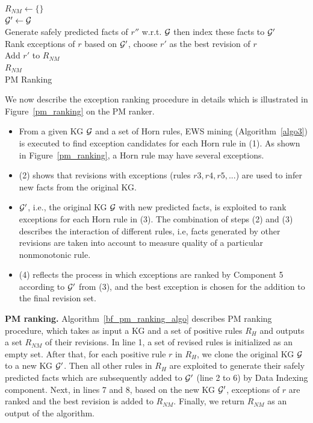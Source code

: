 \IncMargin{1.5em}
\begin{algorithm}[h]
\DontPrintSemicolon
\SetAlgoLined
{}
\BlankLine
$R_{NM} \leftarrow \{\}$\\
\BlankLine
{} {
	$\mathcal{G}' \leftarrow \mathcal{G}$\\
	 {
		Generate safely predicted facts of $r''$ w.r.t. $\mathcal{G}$ then index these facts to $\mathcal{G}'$\\
	}
	Rank exceptions of $r$ based on $\mathcal{G}'$, choose $r'$ as the best revision of $r$\\
	Add $r'$ to $R_{NM}$\\
}
\Return $R_{NM}$\\
\caption{PM Ranking}
\label{bf_pm_ranking_algo}
\end{algorithm}
\DecMargin{1.5em}

We now describe the exception ranking procedure in details which is illustrated in Figure~\ref{pm_ranking} on the PM ranker.

\begin{itemize}
\item From a given KG $\mathcal{G}$ and a set of Horn rules, EWS mining (Algorithm~\ref{algo3}) is executed to find exception candidates for each Horn rule in (1). As shown in Figure~\ref{pm_ranking}, a Horn rule may have several exceptions.
\item (2) shows that revisions with exceptions (rules $r3, r4, r5, ...$) are used to infer new facts from the original KG.
\item $\mathcal{G}'$, i.e., the original KG $\mathcal{G}$ with new predicted facts, is exploited to rank exceptions for each Horn rule in (3). The combination of steps (2) and (3) describes the interaction of different rules, i.e, facts generated by other revisions are taken into account to measure quality of a particular nonmonotonic rule.
\item (4) reflects the process in which exceptions are ranked by Component 5 according to $\mathcal{G}'$ from (3), and the best exception is chosen for the addition to the final revision set.
\end{itemize}

\textbf{PM ranking.} Algorithm~\ref{bf_pm_ranking_algo} describes PM ranking procedure, which takes as input a KG and a set of positive rules $R_H$ and outputs a set $R_{NM}$ of their revisions. In line 1, a set of revised rules is initialized as an empty set. After that, for each positive rule $r$ in $R_H$, we clone the original KG $\mathcal{G}$ to a new KG $\mathcal{G}'$. Then all other rules in $R_H$ are exploited to generate their safely predicted facts which are subsequently added to $\mathcal{G}'$ (line 2 to 6) by Data Indexing component. Next, in lines 7 and 8, based on the new KG $\mathcal{G}'$, exceptions of $r$ are ranked and the best revision is added to $R_{NM}$. Finally, we return $R_{NM}$ as an output of the algorithm.


